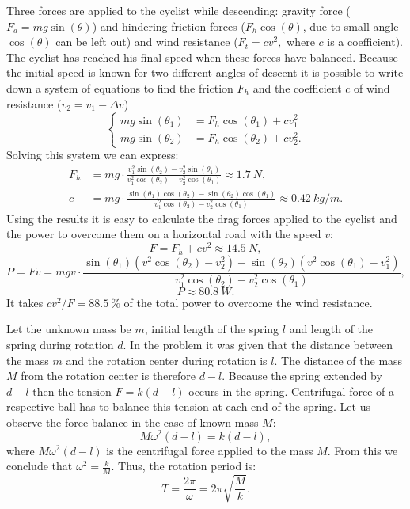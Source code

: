 \documentclass[11pt]{article}
\begin{document}
\solueng
Three forces are applied to the cyclist while descending: gravity force ($F_{a}=mg\sin(\theta)$) and hindering friction forces ($F_{h}\cos(\theta)$, due to small angle $\cos(\theta)$ can be left out) and wind resistance ($F_{t}=cv^{2},$ where $c$ is a coefficient). The cyclist has reached his final speed when these forces have balanced. Because the initial speed is known for two different angles of descent it is possible to write down a system of equations to find the friction $F_{h}$ and the coefficient $c$ of wind resistance ($v_{2}=v_{1}-\Delta v$)
\[
\begin{cases}
mg\sin(\theta_{1})&=F_{h}\cos(\theta_1)+cv_{1}^{2}\\
mg\sin(\theta_{2})&=F_{h}\cos(\theta_2)+cv_{2}^{2}.
\end{cases}
\] 
Solving this system we can express:
\begin{align*}
F_{h} & = mg\cdot\frac{v_{1}^{2}\sin(\theta_{2})-v_{2}^{2}\sin(\theta_{1})}{v_{1}^{2}\cos(\theta_2)-v_{2}^{2}\cos(\theta_1)}\approx\SI{1.7}{N},\\[7pt] 
c & = mg\cdot\frac{\sin(\theta_{1})\cos(\theta_2)-\sin(\theta_{2})\cos(\theta_1)}{v_{1}^{2}\cos(\theta_2)-v_{2}^{2}\cos(\theta_1)}\approx\SI{0.42}{kg/m}.
\end{align*} 
Using the results it is easy to calculate the drag forces applied to the cyclist and the power to overcome them on a horizontal road with the speed $v$:
\[
F=F_{h}+cv^{2}\approx\SI{14.5}{N},
\] 
\[
P=Fv=mgv\cdot\frac{\sin(\theta_{1})\left(v^{2}\cos(\theta_2)-v_{2}^{2}\right)-\sin(\theta_{2})\left(v^{2}\cos(\theta_1)-v_{1}^{2}\right)}{v_{1}^{2}\cos(\theta_2)-v_{2}^{2}\cos(\theta_1)},
\]
\[
P\approx\SI{80.8}{W}.
\]
It takes $cv^{2}/F=\SI{88.5}{\percent}$ of the total power to overcome the wind resistance.
\probend
\bigskip


\solueng
Let the unknown mass be $m$, initial length of the spring $l$ and length of the spring during rotation $d$. In the problem it was given that the distance between the mass $m$ and the rotation center during rotation is $l$. The distance of the mass $M$ from the rotation center is therefore $d-l$. Because the spring extended by $d-l$ then the tension $F=k(d-l)$ occurs in the spring. Centrifugal force of a respective ball has to balance this tension at each end of the spring. Let us observe the force balance in the case of known mass $M$:
\begin{equation*}
M\omega^2(d-l)=k(d-l),
\end{equation*} 
where $M\omega^2(d-l)$ is the centrifugal force applied to the mass $M$. From this we conclude that $\omega^2=\frac{k}{M}$. Thus, the rotation period is:
\begin{equation*}
T=\frac{2\pi}{\omega}=2\pi \sqrt{\frac{M}{k}}.
\end{equation*}
\probend
\bigskip
\end{document}
